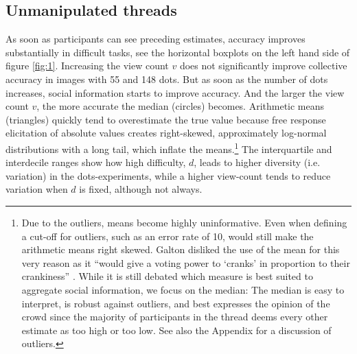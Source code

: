 \documentclass[10pt,a4paper,twocolumn,lineno]{article}
\begin{document}
\subsection{Unmanipulated threads}
As soon as participants can see preceding estimates, accuracy improves substantially in difficult tasks, see the horizontal boxplots on the left hand side of figure \ref{fig:1}. Increasing the view count $v$ does not significantly improve collective accuracy in images with 55 and 148 dots. But as soon as the number of dots increases, social information starts to improve accuracy. And the larger the view count $v$, the more accurate the median (circles) becomes. Arithmetic means (triangles) quickly tend to overestimate the true value because free response elicitation of absolute values creates right-skewed, approximately log-normal distributions with a long tail, which inflate the means.\footnote{Due to the outliers, means become highly uninformative. Even when defining a cut-off for outliers, such as an error rate of 10, would still make the arithmetic means right skewed. Galton disliked the use of the mean for this very reason as it “would give a voting power to ‘cranks’ in proportion to their crankiness” \cite{galton1907vox}. While it is still debated \cite{kao2018counteracting} which measure is best suited to aggregate social information, we focus on the median: The median is easy to interpret, is robust against outliers, and best expresses the opinion of the crowd since the majority of participants in the thread deems every other estimate as too high or too low. See also the Appendix for a discussion of outliers.} The interquartile and interdecile ranges show how high difficulty, $d$, leads to higher diversity (i.e. variation) in the dots-experiments, while a higher view-count tends to reduce variation when $d$ is fixed, although not always.
\end{document}
